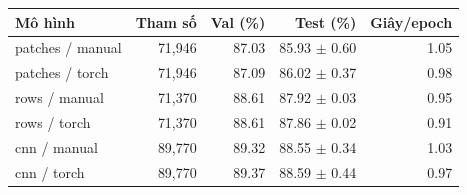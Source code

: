 \begin{tabularx}{\textwidth}{@{}Xrrrr@{}}
\toprule
Mô hình & Tham số & Val (\%) & Test (\%) & Giây/epoch \\
\midrule
patches / manual & 71,946 & 87.03 & 85.93 $\pm$ 0.60 & 1.05 \\
patches / torch & 71,946 & 87.09 & 86.02 $\pm$ 0.37 & 0.98 \\
rows / manual & 71,370 & 88.61 & 87.92 $\pm$ 0.03 & 0.95 \\
rows / torch & 71,370 & 88.61 & 87.86 $\pm$ 0.02 & 0.91 \\
cnn / manual & 89,770 & 89.32 & 88.55 $\pm$ 0.34 & 1.03 \\
cnn / torch & 89,770 & 89.37 & 88.59 $\pm$ 0.44 & 0.97 \\
\bottomrule
\end{tabularx}
